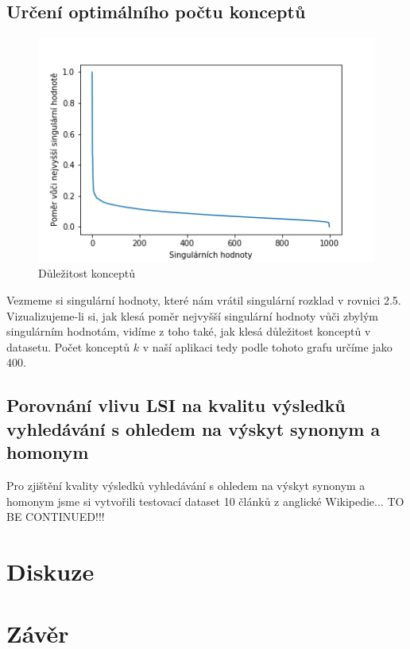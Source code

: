 \documentclass[11pt]{scrartcl} %
\begin{document}
\subsection{Určení optimálního počtu konceptů}

\begin{figure}[h] %
	\centering
	\includegraphics[width=0.5\columnwidth]{singular_values.png}
	\caption{Důležitost konceptů}
\end{figure}

Vezmeme si singulární hodnoty, které nám vrátil singulární rozklad v rovnici 2.5. Vizualizujeme-li si, jak klesá poměr nejvyšší singulární hodnoty vůči zbylým singulárním hodnotám, vidíme z toho také, jak klesá důležitost konceptů v datasetu. Počet konceptů $k$ v naší aplikaci tedy podle tohoto grafu určíme jako 400.

\subsection{Porovnání vlivu LSI na kvalitu výsledků vyhledávání s ohledem na výskyt synonym a homonym}

Pro zjištění kvality výsledků vyhledávání s ohledem na výskyt synonym a homonym jsme si vytvořili testovací dataset 10 článků z anglické Wikipedie... TO BE CONTINUED!!!

\section{Diskuze}


\section{Závěr}
\end{document}
